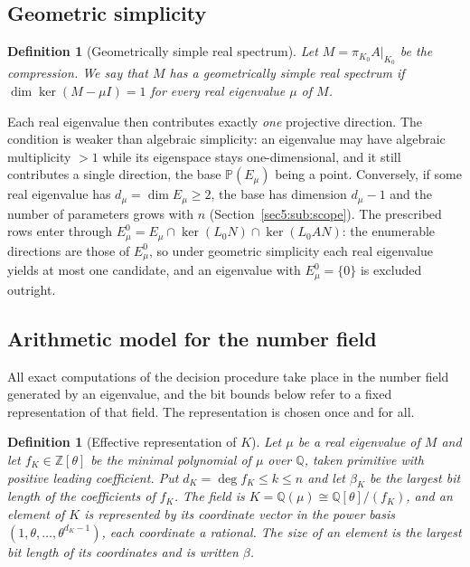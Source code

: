 \documentclass[journal]{IEEEtran}
\theoremstyle{plainn}
\newtheorem{defn}[thm]{Definition}
\theoremstyle{remark}
\begin{document}
\subsection{Geometric simplicity}\label{sec5:sub:gsimple}

\begin{defn}[Geometrically simple real spectrum]\label{sec5:def:gsimple}
Let $M=\pi_{K_0}A|_{K_0}$ be the compression. We say that $M$ has a \emph{geometrically simple real
spectrum} if $\dim\ker(M-\mu I)=1$ for every real eigenvalue $\mu$ of $M$.
\end{defn}

Each real eigenvalue then contributes exactly \emph{one} projective direction. The condition is weaker
than algebraic simplicity: an eigenvalue may have algebraic multiplicity $>1$ while its eigenspace
stays one-dimensional, and it still contributes a single direction, the base
$\mathbb{P}(E_\mu)$ being a point. Conversely, if some real eigenvalue has
$d_\mu=\dim E_\mu\ge2$, the base has dimension $d_\mu-1$ and the number of parameters grows with $n$
(Section~\ref{sec5:sub:scope}). The prescribed rows enter through
$E_\mu^0=E_\mu\cap\ker(L_0N)\cap\ker(L_0AN)$: the enumerable directions are those of $E_\mu^0$, so
under geometric simplicity each real eigenvalue yields at most one candidate, and an eigenvalue with
$E_\mu^0=\{0\}$ is excluded outright.

\subsection{Arithmetic model for the number field}\label{sec5:sub:model}

All exact computations of the decision procedure take place in the number field generated by an
eigenvalue, and the bit bounds below refer to a fixed representation of that field. The representation
is chosen once and for all.

\begin{defn}[Effective representation of $K$]\label{sec5:def:model}
Let $\mu$ be a real eigenvalue of $M$ and let $f_K\in\mathbb{Z}[\theta]$ be the minimal polynomial of
$\mu$ over $\mathbb{Q}$, taken primitive with positive leading coefficient. Put
$d_K=\deg f_K\le k\le n$ and let $\beta_K$ be the largest bit length of the coefficients of $f_K$. The
field is $K=\mathbb{Q}(\mu)\cong\mathbb{Q}[\theta]/(f_K)$, and an element of $K$ is represented by its
coordinate vector in the power basis $(1,\theta,\dots,\theta^{d_K-1})$, each coordinate a rational.
The \emph{size} of an element is the largest bit length of its coordinates and is written $\beta$.
\end{defn}
\end{document}
